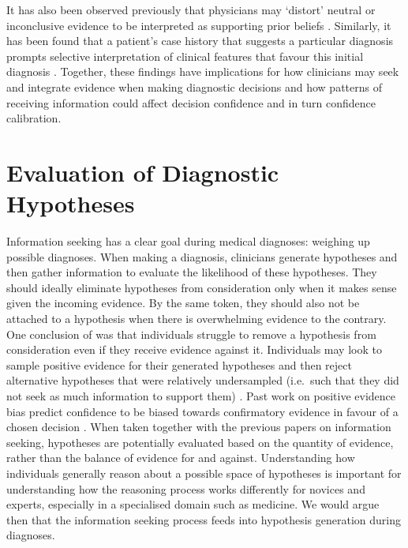 \documentclass[a4paper, nobind]{templates/ociamthesis}
\begin{document}
\hfill\break
It has also been observed previously that physicians may `distort' neutral or inconclusive evidence to be interpreted as supporting prior beliefs \autocite{kostopoulou_information_2012}. Similarly, it has been found that a patient's case history that suggests a particular diagnosis prompts selective interpretation of clinical features that favour this initial diagnosis \autocite{leblanc_believing_2002}. Together, these findings have implications for how clinicians may seek and integrate evidence when making diagnostic decisions and how patterns of receiving information could affect decision confidence and in turn confidence calibration.

\section{Evaluation of Diagnostic Hypotheses}\label{evaluation-of-diagnostic-hypotheses}

Information seeking has a clear goal during medical diagnoses: weighing up possible diagnoses. When making a diagnosis, clinicians generate hypotheses and then gather information to evaluate the likelihood of these hypotheses. They should ideally eliminate hypotheses from consideration only when it makes sense given the incoming evidence. By the same token, they should also not be attached to a hypothesis when there is overwhelming evidence to the contrary. One conclusion of \textcite{wason_failure_1960} was that individuals struggle to remove a hypothesis from consideration even if they receive evidence against it. Individuals may look to sample positive evidence for their generated hypotheses and then reject alternative hypotheses that were relatively undersampled (i.e.~such that they did not seek as much information to support them) \autocite{hunt_approach-induced_2016}. Past work on positive evidence bias predict confidence to be biased towards confirmatory evidence in favour of a chosen decision \autocite{peters_perceptual_2017}. When taken together with the previous papers on information seeking, hypotheses are potentially evaluated based on the quantity of evidence, rather than the balance of evidence for and against. Understanding how individuals generally reason about a possible space of hypotheses is important for understanding how the reasoning process works differently for novices and experts, especially in a specialised domain such as medicine. We would argue then that the information seeking process feeds into hypothesis generation during diagnoses.
\end{document}
